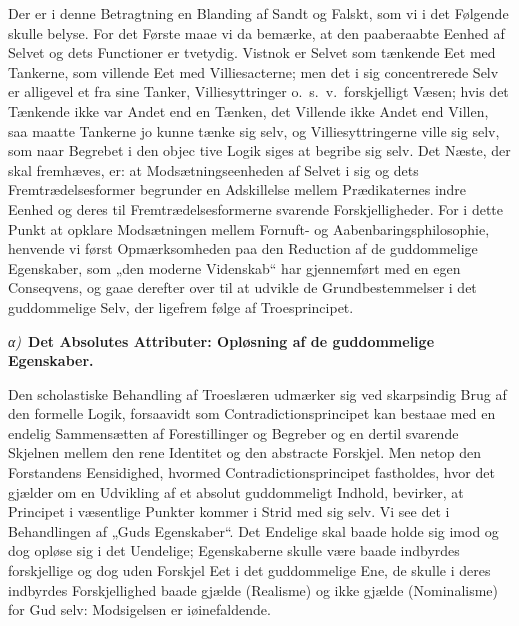 \documentclass[12pt]{book}
\newcommand{\greekrun}[2]{%
  \medskip\begin{center}{\itshape #1)}\ {\bfseries #2}\end{center}\medskip}
\begin{document}
Der er i denne Betragtning en Blanding af Sandt og Falskt, som vi i
det Følgende skulle belyse. For det Første maae vi da bemærke, at
den paaberaabte Eenhed af Selvet og dets Functioner er tvetydig.
Vistnok er Selvet som tænkende Eet med Tankerne, som villende Eet
med Villiesacterne; men det i sig concentrerede Selv er alligevel et
fra sine Tanker, Villiesyttringer o.\ s.\ v.\ forskjelligt Væsen;
hvis det Tænkende ikke var Andet end en Tænken, det Villende ikke
Andet end Villen, saa maatte Tankerne jo kunne tænke sig selv, og
Villiesyttringerne ville sig selv, som naar Begrebet i den objec\-
tive Logik siges at begribe sig selv. Det Næste, der skal fremhæves,
er: at Modsætningseenheden af Selvet i sig og dets
Fremtrædelsesformer begrunder en Adskillelse mellem Prædikaternes
indre Eenhed og deres til Fremtrædelsesformerne svarende
Forskjelligheder. For i dette Punkt at opklare Modsætningen mellem
Fornuft- og Aabenbaringsphilosophie, henvende vi først
Opmærksomheden paa den Reduction af de guddommelige Egenskaber, som
„den moderne Videnskab“ har gjennemført med en egen Conseqvens, og
gaae derefter over til at udvikle de Grundbestemmelser i det
guddommelige Selv, der ligefrem følge af Troesprincipet.

\greekrun{α}{Det Absolutes Attributer: Opløsning af de guddommelige
Egenskaber.}

Den scholastiske Behandling af Troeslæren udmærker sig ved
skarpsindig Brug af den formelle Logik, forsaavidt som
Contradictionsprincipet kan bestaae med en endelig Sammensætten af
Forestillinger og Begreber og en dertil svarende Skjelnen mellem den
rene Identitet og den abstracte Forskjel. Men netop den Forstandens
Eensidighed, hvormed Contradictionsprincipet fastholdes, hvor det
gjælder om en Udvikling af et absolut guddommeligt Indhold,
bevirker, at Principet i væsentlige Punkter kommer i Strid med sig
selv. Vi see det i Behandlingen af „Guds Egenskaber“. Det Endelige
skal baade holde sig imod og dog opløse sig i det Uendelige;
Egenskaberne skulle være baade indbyrdes forskjellige og dog uden
Forskjel Eet i det guddommelige Ene, de skulle i deres indbyrdes
Forskjellighed baade gjælde (Realisme) og ikke gjælde (Nominalisme)
for Gud selv: Modsigelsen er iøinefaldende.
\end{document}
